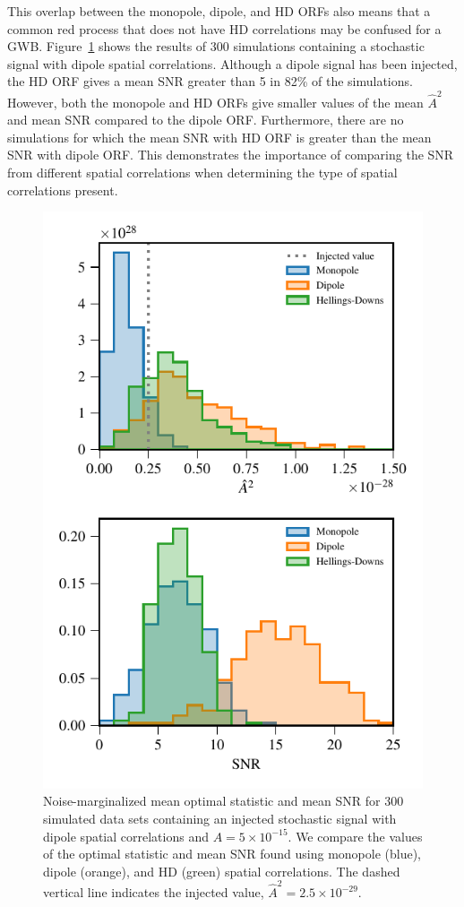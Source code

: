 \documentclass[twocolumn,aps,prd,superscriptaddress]{revtex4-1}
\begin{document}
This overlap between the monopole, dipole, and HD ORFs also means that 
a common red process that does not have HD correlations  
may be confused for a GWB. Figure~\ref{fig:os_dipole} shows the results of 300 simulations 
containing a stochastic signal with dipole spatial correlations. 
Although a dipole signal has been injected, 
the HD ORF gives a mean SNR greater than 5 in 82\% of the simulations. 
However, both the monopole and HD ORFs give smaller values of 
the mean $\hat{A}^2$ and mean SNR compared to the dipole ORF. 
Furthermore, there are no simulations for which the mean SNR with HD ORF 
is greater than the mean SNR with dipole ORF. 
This demonstrates the importance of comparing the SNR from different spatial correlations 
when determining the type of spatial correlations present.
\begin{figure}[t]
	\includegraphics[width=0.9\columnwidth]{plots/optstat_dipole_A5e-15.pdf}
	\caption{Noise-marginalized mean optimal statistic and mean SNR for 300 simulated data sets 
			containing an injected stochastic signal with dipole spatial correlations and $A = 5\times10^{-15}$. 
			We compare the values of the optimal statistic and mean SNR 
			found using monopole (blue), dipole (orange), 
			and HD (green) spatial correlations. 
			The dashed vertical line indicates the injected value, $\hat{A}^2 = 2.5 \times 10^{-29}$.}
	\label{fig:os_dipole}
\end{figure}
\end{document}
